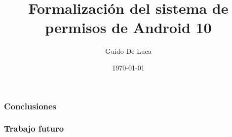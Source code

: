\documentclass[handout, pdf]{beamer}
\title{Formalización del sistema de permisos de Android 10}
\author[Universidad Nacional de Rosario]{Guido De Luca}
\institute{Universidad Nacional de Rosario}
\date{\today}
\begin{document}
\begin{frame}[plain]
    \titlepage
\end{frame}

\begin{frame}
    \frametitle{Conclusiones}
\end{frame}

\begin{frame}
    \frametitle{Trabajo futuro}
\end{frame}
\end{document}
